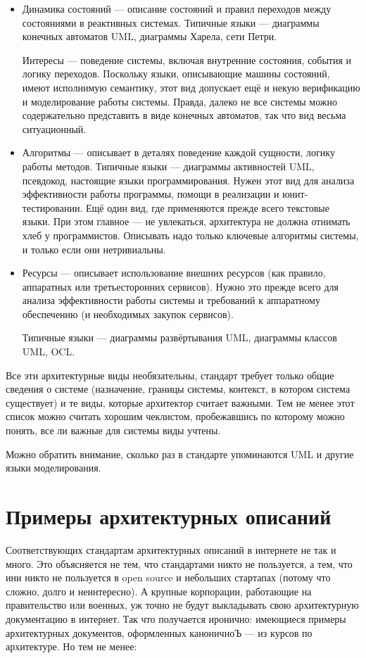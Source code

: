 \documentclass[a5paper]{article}
\begin{document}
\begin{itemize}
	\item Динамика состояний --- описание состояний и правил переходов между состояниями в реактивных системах. Типичные языки --- диаграммы конечных автоматов UML, диаграммы Харела, сети Петри.
	
	Интересы --- поведение системы, включая внутренние состояния, события и логику переходов. Поскольку языки, описывающие машины состояний, имеют исполнимую семантику, этот вид допускает ещё и некую верификацию и моделирование работы системы. Правда, далеко не все системы можно содержательно представить в виде конечных автоматов, так что вид весьма ситуационный.
	
	\item Алгоритмы --- описывает в деталях поведение каждой сущности, логику работы методов. Типичные языки --- диаграммы активностей UML, псевдокод, настоящие языки программирования. Нужен этот вид для  анализа эффективности работы программы, помощи в реализации и юнит-тестировании. Ещё один вид, где применяются прежде всего текстовые языки. При этом главное --- не увлекаться, архитектура не должна отнимать хлеб у программистов. Описывать надо только ключевые алгоритмы системы, и только если они нетривиальны.
	
	\item Ресурсы --- описывает использование внешних ресурсов (как правило, аппаратных или третьесторонних сервисов). Нужно это прежде всего для анализа эффективности работы системы и требований к аппаратному обеспечению (и необходимых закупок сервисов).
	
	Типичные языки --- диаграммы развёртывания UML, диаграммы классов UML, OCL.
\end{itemize}

Все эти архитектурные виды необязательны, стандарт требует только общие сведения о системе (назначение, границы системы, контекст, в котором система существует) и те виды, которые архитектор считает важными. Тем не менее этот список можно считать хорошим чеклистом, пробежавшись по которому можно понять, все ли важные для системы виды учтены.

Можно обратить внимание, сколько раз в стандарте упоминаются UML и другие языки моделирования.

\section{Примеры архитектурных описаний}

Соответствующих стандартам архитектурных описаний в интернете не так и много. Это объясняется не тем, что стандартами никто не пользуется, а тем, что ини никто не пользуется в open source и небольших стартапах (потому что сложно, долго и неинтересно). А крупные корпорации, работающие на правительство или военных, уж точно не будут выкладывать свою архитектурную документацию в интернет. Так что получается иронично: имеющиеся примеры архитектурных документов, оформленных каноничноЪ --- из курсов по архитектуре. Но тем не менее:
\end{document}
